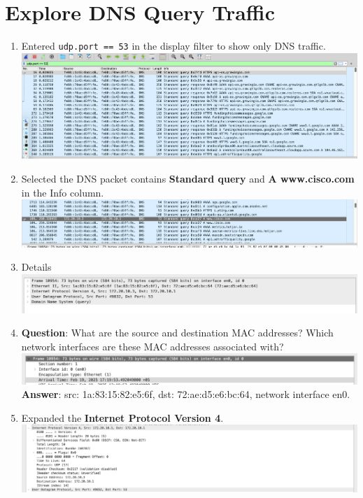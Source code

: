\documentclass[12pt]{article}
\begin{document}
\section{Explore DNS Query Traffic}

\begin{enumerate}
    \item Entered \texttt{udp.port == 53} in the display filter to show only DNS traffic. \\
    \includegraphics[width=.7\textwidth]{Image9.png} \\
    \item Selected the DNS packet contains \textbf{Standard query} and \textbf{A www.cisco.com} in the Info column. \\
    \includegraphics[width=.7\textwidth]{Image10.png} \\
    \item Details \\
    \includegraphics[width=.7\textwidth]{Image11.png} \\
    \item \textbf{Question}: What are the source and destination MAC addresses? Which network interfaces are these MAC addresses associated with? \\
    \includegraphics[width=.7\textwidth]{Image12.png} \\
    \textbf{Answer}: src: 1a:83:15:82:e5:6f, dst: 72:ae:d5:e6:bc:64, network interface en0. \\ 
    \item Expanded the \textbf{Internet Protocol Version 4}. \\
    \includegraphics[width=.7\textwidth]{Image13.png} 

\end{enumerate}
\end{document}
